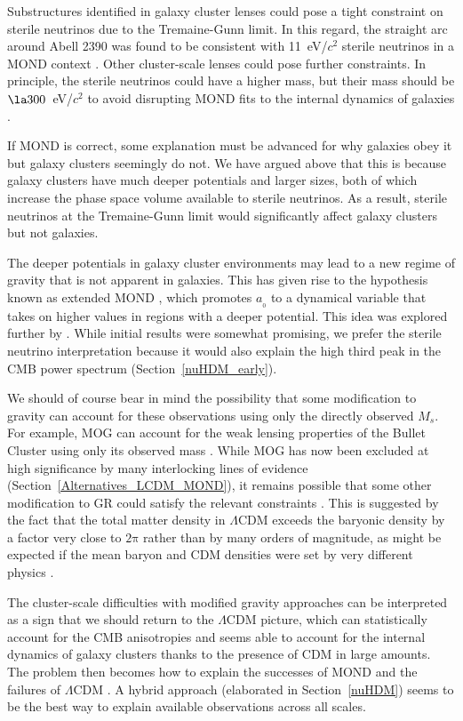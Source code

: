\documentclass[fleqn,usenatbib,useAMS]{mnras} %
\begin{document}
Substructures identified in galaxy cluster lenses could pose a tight constraint on sterile neutrinos due to the Tremaine-Gunn limit. In this regard, the straight arc around Abell 2390 was found to be consistent with 11~eV/$c^2$ sterile neutrinos in a MOND context \citep{Feix_2010}. Other cluster-scale lenses could pose further constraints. In principle, the sterile neutrinos could have a higher mass, but their mass should be $\la 300$~eV/$c^2$ to avoid disrupting MOND fits to the internal dynamics of galaxies \citep{Angus_2010_minimum_neutrino_mass}.

If MOND is correct, some explanation must be advanced for why galaxies obey it but galaxy clusters seemingly do not. We have argued above that this is because galaxy clusters have much deeper potentials and larger sizes, both of which increase the phase space volume available to sterile neutrinos. As a result, sterile neutrinos at the Tremaine-Gunn limit would significantly affect galaxy clusters but not galaxies.

The deeper potentials in galaxy cluster environments may lead to a new regime of gravity that is not apparent in galaxies. This has given rise to the hypothesis known as extended MOND \citep[EMOND;][]{Zhao_2012}, which promotes $a_{_0}$ to a dynamical variable that takes on higher values in regions with a deeper potential. This idea was explored further by \citet{Hodson_2017_EMOND}. While initial results were somewhat promising, we prefer the sterile neutrino interpretation because it would also explain the high third peak in the CMB power spectrum (Section~\ref{nuHDM_early}).

We should of course bear in mind the possibility that some modification to gravity can account for these observations using only the directly observed $M_s$. For example, MOG can account for the weak lensing properties of the Bullet Cluster using only its observed mass \citep{Brownstein_2007}. While MOG has now been excluded at high significance by many interlocking lines of evidence (Section~\ref{Alternatives_LCDM_MOND}), it remains possible that some other modification to GR could satisfy the relevant constraints \citep[e.g.][]{Acedo_2017}. This is suggested by the fact that the total matter density in $\Lambda$CDM exceeds the baryonic density by a factor very close to $2\mathrm{\pi}$ rather than by many orders of magnitude, as might be expected if the mean baryon and CDM densities were set by very different physics \citep{Milgrom_2020_history}.

The cluster-scale difficulties with modified gravity approaches can be interpreted as a sign that we should return to the $\Lambda$CDM picture, which can statistically account for the CMB anisotropies \citep{Planck_2020} and seems able to account for the internal dynamics of galaxy clusters thanks to the presence of CDM in large amounts. The problem then becomes how to explain the successes of MOND \citep[e.g.][]{Famaey_McGaugh_2012, Lelli_2017, Shelest_2020} and the failures of $\Lambda$CDM \citep[e.g.][]{Kroupa_2012, Kroupa_2015, Peebles_2020}. A hybrid approach (elaborated in Section~\ref{nuHDM}) seems to be the best way to explain available observations across all scales.
\end{document}
